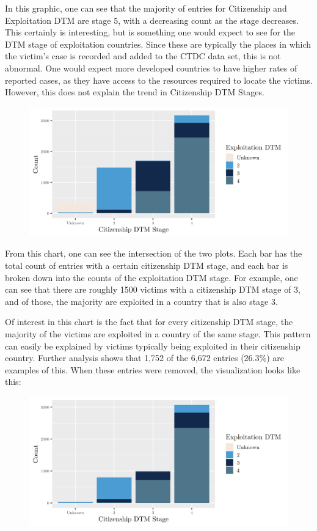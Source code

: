 \documentclass{article} %
\begin{document}
In this graphic, one can see that the majority of entries for Citizenship and Exploitation DTM are stage 5, with a decreasing count as the stage decreases. This certainly is interesting, but is something one would expect to see for the DTM stage of exploitation countries. Since these are typically the places in which the victim's case is recorded and added to the CTDC data set, this is not abnormal. One would expect more developed countries to have higher rates of reported cases, as they have access to the resources required to locate the victims. However, this does not explain the trend in Citizenship DTM Stages.
\FloatBarrier
\begin{figure}[H]
	\includegraphics[width = \textwidth]{DTMStage1}
\end{figure}
\FloatBarrier


From this chart, one can see the intersection of the two plots. Each bar has the total count of entries with a certain citizenship DTM stage, and each bar is broken down into the counts of the exploitation DTM stage. For example, one can see that there are roughly 1500 victims with a citizenship DTM stage of 3, and of those, the majority are exploited in a country that is also stage 3.

Of interest in this chart is the fact that for every citizenship DTM stage, the majority of the victims are exploited in a country of the same stage. This pattern can easily be explained by victims typically being exploited in their citizenship country. Further analysis shows that 1,752 of the 6,672 entries (26.3\%) are examples of this. When these entries were removed, the visualization looks like this:

\FloatBarrier
\begin{figure}[H]
	\includegraphics[width = \textwidth]{Different_CountryDTM}
\end{figure}
\FloatBarrier
\end{document}
